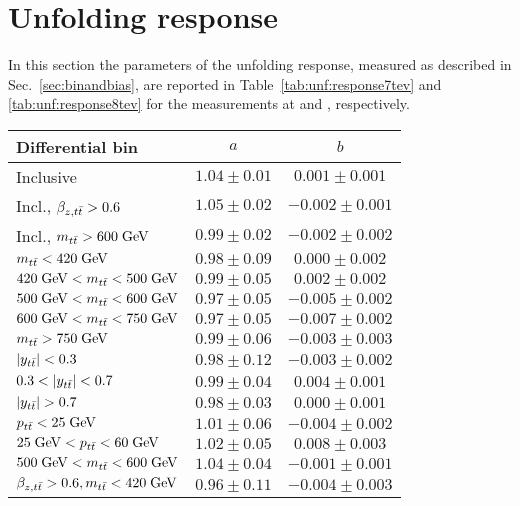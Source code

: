 \section{Unfolding response}
\label{app:unfolding:linearity}

In this section the parameters of the unfolding response, measured as
described in Sec.~\ref{sec:binandbias}, are reported in
Table~\ref{tab:unf:response7tev} and \ref{tab:unf:response8tev} for
the measurements at \seventev{} and \eighttev{}, respectively. 

\begin{table}[htbp]
  \begin{center}
    \begin{tabular}{l c c}
      \toprule
      Differential bin & $a$ & $b$ \\
      \midrule
      Inclusive                           & $1.04\pm0.01$ & $0.001\pm0.001$\\
      Incl., $\beta_{z,t\bar{t}}{}>0.6$        & $1.05\pm0.02$ & $-0.002\pm0.001$\\
      Incl., $m_{t\bar{t}}{}>600\; \mathrm{GeV}{}$ & $0.99\pm0.02$ & $-0.002\pm0.002$\\
      \midrule
      $m_{t\bar{t}}{}<420\; \mathrm{GeV}{}$                & $0.98\pm0.09$  & $0.000\pm0.002$\\
      $420\; \mathrm{GeV}{}<m_{t\bar{t}}{}<500\; \mathrm{GeV}{}$& $0.99\pm0.05$  & $0.002\pm0.002$  \\
      $500\; \mathrm{GeV}{}<m_{t\bar{t}}{}<600\; \mathrm{GeV}{}$& $0.97\pm0.05$  & $-0.005\pm0.002$\\
      $600\; \mathrm{GeV}{}<m_{t\bar{t}}{}<750\; \mathrm{GeV}{}$& $0.97\pm0.05$ & $-0.007\pm0.002$\\
      $m_{t\bar{t}}{} >750\; \mathrm{GeV}{}$& $0.99\pm0.06$ & $-0.003\pm0.003$\\
      \midrule
      $|y_{t\bar{t}}{}|<0.3$                & $0.98\pm0.12$  & $-0.003\pm0.002$\\
      $0.3<|\ytt{}|<0.7$         & $0.99\pm0.04$  & $0.004\pm0.001$\\
      $|\ytt{}|>0.7$                & $0.98\pm0.03$  & $0.000\pm0.001$\\
      \midrule
      $p_{t\bar{t}}{}<25\; \mathrm{GeV}{}$                & $1.01\pm0.06$  & $-0.004\pm0.002$\\
      $25\; \mathrm{GeV}{}<p_{t\bar{t}}{}<60\; \mathrm{GeV}{}$& $1.02\pm0.05$  & $0.008\pm0.003$  \\
      $500\; \mathrm{GeV}{}<m_{t\bar{t}}{}<600\; \mathrm{GeV}{}$& $1.04\pm0.04$  & $-0.001\pm0.001$\\
      \midrule
      $\beta_{z,t\bar{t}}{}>0.6, m_{t\bar{t}}{}<420\; \mathrm{GeV}{}$                & $0.96\pm0.11$  & $-0.004\pm0.003$\\

\end{tabular}
\end{center}
\end{table}
